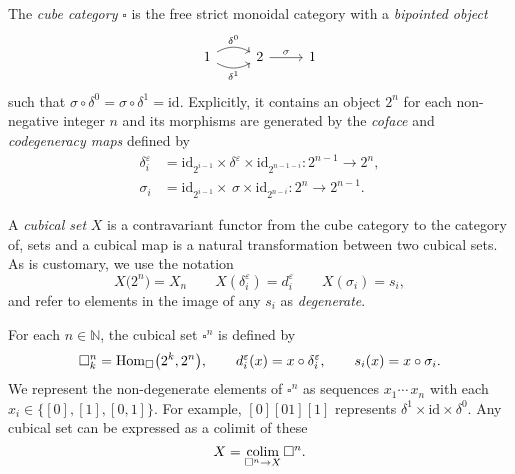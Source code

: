 The \textit{cube category} $\square$ is the free strict monoidal category with a \textit{bipointed object}
\begin{equation*}
\begin{tikzcd}
1 \arrow[r, bend left, "\delta^0"] \arrow[r, bend right, "\delta^1"'] & 2 \arrow[r, "\sigma"] & 1
\end{tikzcd}
\end{equation*}
such that $\sigma \circ \delta^0 = \sigma \circ \delta^1 = \mathrm{id}$.
Explicitly, it contains an object $2^n$ for each non-negative integer $n$ and its morphisms are generated by the \textit{coface} and \textit{codegeneracy maps} defined by
\begin{align*}
\delta_i^\varepsilon & = \mathrm{id}_{2^{i-1}} \times \delta^\varepsilon \times \mathrm{id}_{2^{n-1-i}} \colon 2^{n-1} \to 2^n, \\
\sigma_i & = \mathrm{id}_{2^{i-1}} \times \, \sigma \times \mathrm{id}_{2^{n-i}} \colon 2^{n} \to 2^{n-1}.
\end{align*}

A \textit{cubical set} $X$ is a contravariant functor from the cube category to the category of, sets and a cubical map is a natural transformation between two cubical sets.
As is customary, we use the notation
\begin{equation*}
X\big( 2^n \big) = X_n \qquad X(\delta^\varepsilon_i) = d^\varepsilon_i \qquad X(\sigma_i) = s_i,
\end{equation*}
and refer to elements in the image of any $s_i$ as \textit{degenerate}.

For each $n \in \mathbb{N}$, the cubical set $\square^n$ is defined by
\begin{equation*}
\square^n_k = \mathrm{Hom}_{\square} \big( 2^k, 2^n \big), \qquad 
d^\varepsilon_i(x) = x \circ \delta^\varepsilon_i, \qquad 
s_i(x) = x \circ \sigma_i.
\end{equation*}
We represent the non-degenerate elements of $\square^n$ as sequences $x_1 \cdots\, x_n$ with each $x_i \in \big\{[0], [1], [0,1]\big\}$.
For example, $[0][01][1]$ represents $\delta^1 \times \mathrm{id} \times \delta^0$.
Any cubical set can be expressed as a colimit of these
\begin{equation*}
X = \operatorname*{colim}_{\square^n \to X} \square^n.
\end{equation*}

